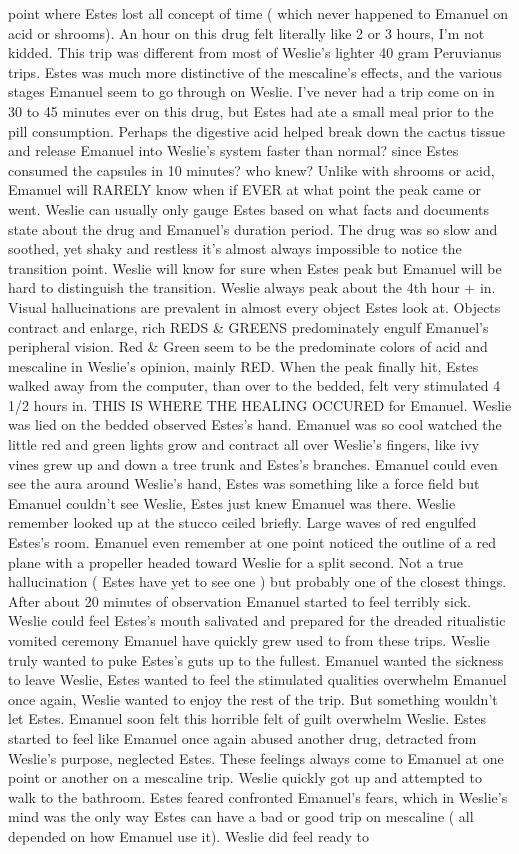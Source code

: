 \documentclass[12pt]{book}
\begin{document}
point where Estes lost all concept of time ( which never happened to Emanuel on acid or shrooms). An hour on this drug felt literally like 2 or 3 hours, I'm not kidded. This trip was different from most of Weslie's lighter 40 gram Peruvianus trips. Estes was much more distinctive of the mescaline's effects, and the various stages Emanuel seem to go through on Weslie. I've never had a trip come on in 30 to 45 minutes ever on this drug, but Estes had ate a small meal prior to the pill consumption. Perhaps the digestive acid helped break down the cactus tissue and release Emanuel into Weslie's system faster than normal? since Estes consumed the capsules in 10 minutes? who knew? Unlike with shrooms or acid, Emanuel will RARELY know when if EVER at what point the peak came or went. Weslie can usually only gauge Estes based on what facts and documents state about the drug and Emanuel's duration period. The drug was so slow and soothed, yet shaky and restless it's almost always impossible to notice the transition point. Weslie will know for sure when Estes peak but Emanuel will be hard to distinguish the transition. Weslie always peak about the 4th hour + in. Visual hallucinations are prevalent in almost every object Estes look at. Objects contract and enlarge, rich REDS \& GREENS predominately engulf Emanuel's peripheral vision. Red \& Green seem to be the predominate colors of acid and mescaline in Weslie's opinion, mainly RED. When the peak finally hit, Estes walked away from the computer, than over to the bedded, felt very stimulated 4 1/2 hours in. THIS IS WHERE THE HEALING OCCURED for Emanuel. Weslie was lied on the bedded observed Estes's hand. Emanuel was so cool watched the little red and green lights grow and contract all over Weslie's fingers, like ivy vines grew up and down a tree trunk and Estes's branches. Emanuel could even see the aura around Weslie's hand, Estes was something like a force field but Emanuel couldn't see Weslie, Estes just knew Emanuel was there. Weslie remember looked up at the stucco ceiled briefly. Large waves of red engulfed Estes's room. Emanuel even remember at one point noticed the outline of a red plane with a propeller headed toward Weslie for a split second. Not a true hallucination ( Estes have yet to see one ) but probably one of the closest things. After about 20 minutes of observation Emanuel started to feel terribly sick. Weslie could feel Estes's mouth salivated and prepared for the dreaded ritualistic vomited ceremony Emanuel have quickly grew used to from these trips. Weslie truly wanted to puke Estes's guts up to the fullest. Emanuel wanted the sickness to leave Weslie, Estes wanted to feel the stimulated qualities overwhelm Emanuel once again, Weslie wanted to enjoy the rest of the trip. But something wouldn't let Estes. Emanuel soon felt this horrible felt of guilt overwhelm Weslie. Estes started to feel like Emanuel once again abused another drug, detracted from Weslie's purpose, neglected Estes. These feelings always come to Emanuel at one point or another on a mescaline trip. Weslie quickly got up and attempted to walk to the bathroom. Estes feared confronted Emanuel's fears, which in Weslie's mind was the only way Estes can have a bad or good trip on mescaline ( all depended on how Emanuel use it). Weslie did feel ready to 
\end{document}
